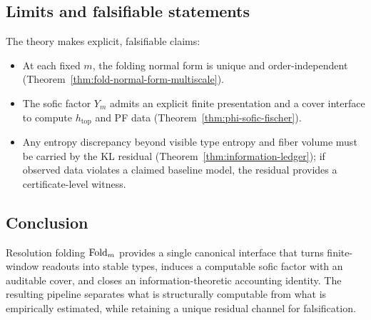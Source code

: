 \subsection{Limits and falsifiable statements}\label{subsec:extensions-falsifiable}
The theory makes explicit, falsifiable claims:
\begin{itemize}
  \item At each fixed $m$, the folding normal form is unique and order-independent (Theorem~\ref{thm:fold-normal-form-multiscale}).
  \item The sofic factor $Y_m$ admits an explicit finite presentation and a cover interface to compute $h_{\mathrm{top}}$ and PF data (Theorem~\ref{thm:phi-sofic-fischer}).
  \item Any entropy discrepancy beyond visible type entropy and fiber volume must be carried by the KL residual (Theorem~\ref{thm:information-ledger}); if observed data violates a claimed baseline model, the residual provides a certificate-level witness.
\end{itemize}

\subsection{Conclusion}\label{subsec:extensions-conclusion}
Resolution folding $\mathrm{Fold}_m$ provides a single canonical interface that turns finite-window readouts into stable types, induces a computable sofic factor with an auditable cover, and closes an information-theoretic accounting identity.
The resulting pipeline separates what is structurally computable from what is empirically estimated, while retaining a unique residual channel for falsification.

